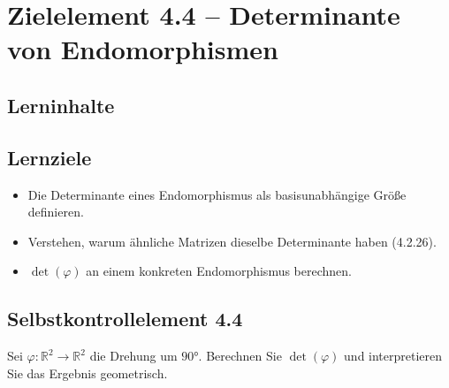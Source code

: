 \documentclass[a4paper,12pt]{article}
\begin{document}
\newpage

\section*{Zielelement 4.4 -- Determinante von Endomorphismen}

\subsection*{Lerninhalte}
\begin{center}
\end{center}

\subsection*{Lernziele}
\begin{itemize}
  \item Die Determinante eines Endomorphismus als basisunabhängige Größe definieren.
  \item Verstehen, warum ähnliche Matrizen dieselbe Determinante haben (4.2.26).
  \item $\det(\varphi)$ an einem konkreten Endomorphismus berechnen.
\end{itemize}

\subsection*{Selbstkontrollelement 4.4}
Sei $\varphi: \mathbb{R}^2 \to \mathbb{R}^2$ die Drehung um $90°$. Berechnen Sie $\det(\varphi)$ und interpretieren Sie das Ergebnis geometrisch.
\end{document}
